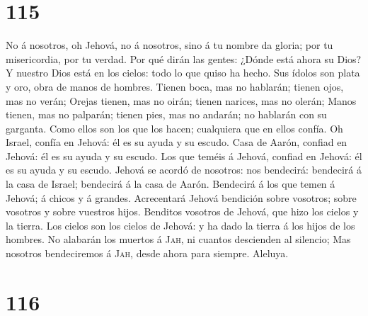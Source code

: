 \hypertarget{section-114}{%
\section{115}\label{section-114}}

 No á nosotros, oh Jehová, no á nosotros, sino á tu nombre
da gloria; por tu misericordia, por tu verdad.  Por qué
dirán las gentes: ¿Dónde está ahora su Dios?  Y nuestro
Dios está en los cielos: todo lo que quiso ha hecho.  Sus
ídolos son plata y oro, obra de manos de hombres.  Tienen
boca, mas no hablarán; tienen ojos, mas no verán;  Orejas
tienen, mas no oirán; tienen narices, mas no olerán; 
Manos tienen, mas no palparán; tienen pies, mas no andarán; no hablarán
con su garganta.  Como ellos son los que los hacen;
cualquiera que en ellos confía.  Oh Israel, confía en
Jehová: él es su ayuda y su escudo.  Casa de Aarón,
confiad en Jehová: él es su ayuda y su escudo.  Los que
teméis á Jehová, confiad en Jehová: él es su ayuda y su escudo.
 Jehová se acordó de nosotros: nos bendecirá: bendecirá á
la casa de Israel; bendecirá á la casa de Aarón. 
Bendecirá á los que temen á Jehová; á chicos y á grandes.
 Acrecentará Jehová bendición sobre vosotros; sobre
vosotros y sobre vuestros hijos.  Benditos vosotros de
Jehová, que hizo los cielos y la tierra.  Los cielos son
los cielos de Jehová: y ha dado la tierra á los hijos de los hombres.
 No alabarán los muertos á \textsc{Jah}, ni cuantos
descienden al silencio;  Mas nosotros bendeciremos á
\textsc{Jah}, desde ahora para siempre. Aleluya.

\hypertarget{section-115}{%
\section{116}\label{section-115}}

